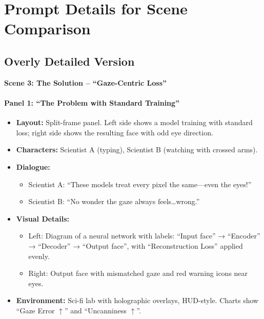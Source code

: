 \section{Prompt Details for Scene Comparison}\label{sec:prompt-details-for-scene-comparison}

\subsection{Overly Detailed Version}

\textbf{Scene 3: The Solution -- ``Gaze-Centric Loss''}

\paragraph{Panel 1: ``The Problem with Standard Training''}
\begin{itemize}
    \item \textbf{Layout:} Split-frame panel. Left side shows a model training with standard loss; right side shows the resulting face with odd eye direction.
    \item \textbf{Characters:} Scientist A (typing), Scientist B (watching with crossed arms).
    \item \textbf{Dialogue:}
    \begin{itemize}
        \item Scientist A: ``These models treat every pixel the same---even the eyes!''
        \item Scientist B: ``No wonder the gaze always feels\ldots wrong.''
    \end{itemize}
    \item \textbf{Visual Details:}
    \begin{itemize}
        \item Left: Diagram of a neural network with labels: ``Input face'' → ``Encoder'' → ``Decoder'' → ``Output face'', with ``Reconstruction Loss'' applied evenly.
        \item Right: Output face with mismatched gaze and red warning icons near eyes.
    \end{itemize}
    \item \textbf{Environment:} Sci-fi lab with holographic overlays, HUD-style. Charts show ``Gaze Error $\uparrow$'' and ``Uncanniness $\uparrow$''.
\end{itemize}

